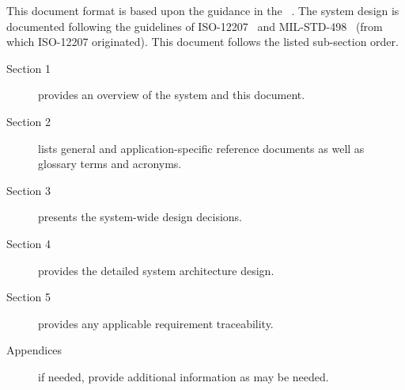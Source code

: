This document format is based upon the guidance in the \SSDD{} \DID~\cite{ref__SSDD_DID}.
The system design is documented following the guidelines of ISO-12207~\cite{ref__ISO_12207} and MIL-STD-498~\cite{ref__MIL_STD_498} (from which ISO-12207 originated).
This document follows the listed \SSDD sub-section order.
\begin{description}
	\item[Section 1] provides an overview of the system and this document.
	\item[Section 2] lists general and application-specific reference documents as well as glossary terms and acronyms. 
	\item[Section 3] presents the system-wide design decisions.
	\item[Section 4] provides the detailed system architecture design. 
	\item[Section 5] provides any applicable requirement traceability.
	\item[Appendices] if needed, provide additional information as may be needed.
\end{description}